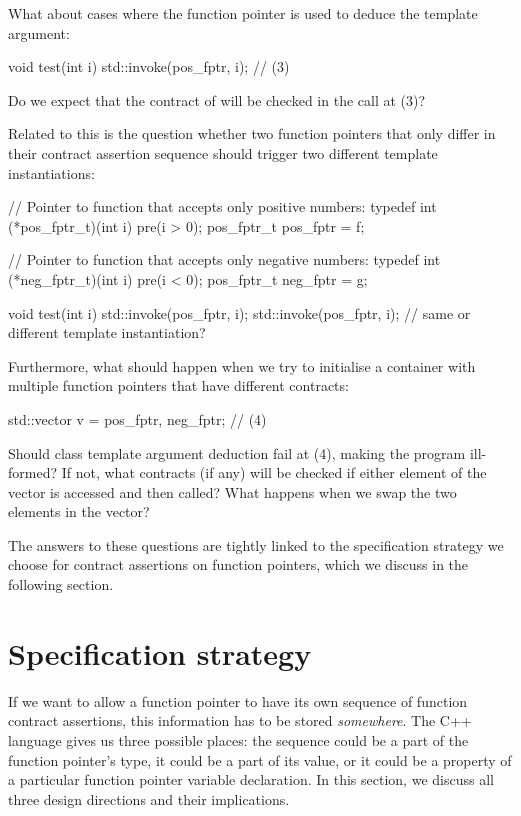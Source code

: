 What about cases where the function pointer is used to deduce the template argument:
\begin{codeblock}
void test(int i) {
  std::invoke(pos_fptr, i);  // (3)
}
\end{codeblock}
Do we expect that the contract of  will be checked in the call at (3)?

Related to this is the question whether two function pointers that only differ in their contract assertion sequence should trigger two different template instantiations:
\begin{codeblock}
// Pointer to function that accepts only positive numbers:
typedef int (*pos_fptr_t)(int i) pre(i > 0);
pos_fptr_t pos_fptr = f;

// Pointer to function that accepts only negative numbers:
typedef int (*neg_fptr_t)(int i) pre(i < 0);
pos_fptr_t neg_fptr = g;

void test(int i) {
  std::invoke(pos_fptr, i);
  std::invoke(pos_fptr, i);  // same or different template instantiation?
}
\end{codeblock}
Furthermore, what should happen when we try to initialise a container with multiple function pointers that have different contracts:
\begin{codeblock}
std::vector v = {pos_fptr, neg_fptr};  // (4)
\end{codeblock}
Should class template argument deduction fail at (4), making the program ill-formed? If not, what contracts (if any) will be checked if either element of the vector is accessed and then called? What happens when we swap the two elements in the vector?

The answers to these questions are tightly linked to the specification strategy we choose for contract assertions on function pointers, which we discuss in the following section.

\section{Specification strategy}
\label{wherelive}


If we want to allow a function pointer to have its own sequence of function contract assertions, this information has to be stored \emph{somewhere}. The C++ language gives us three possible places: the sequence could be a part of the function pointer's type, it could be a part of its value, or it could be a property of a particular function pointer variable declaration. In this section, we discuss all three design directions and their implications.

